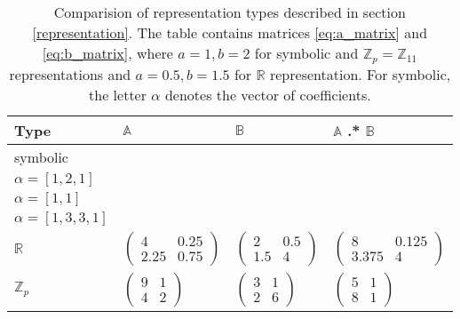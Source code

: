 \begin{table}
\tiny
\centering
\begin{tabular}{llll}
\hline
Type & $\mathbb{A}$ & $\mathbb{B}$ & $\mathbb{A}$ .* $\mathbb{B}$ \\
\hline
symbolic & \specialcell{$\begin{pmatrix} 2 & 1 & 0\\ 0 & 1 & 2 \end{pmatrix}$\\$\alpha = [1, 2, 1]$}  & \specialcell{$\begin{pmatrix} 1 & 0 \\ 0 & 1 \end{pmatrix}$\\$\alpha = [1, 1]$} & \specialcell{$\begin{pmatrix} 3 & 2 & 1 & 0 \\ 0 & 1 & 2 & 3 \end{pmatrix}$\\$\alpha = [1, 3, 3, 1]$} \\[15pt]

$\mathbb{R}$ & $\begin{pmatrix} 4 & 0.25\\ 2.25 & 0.75 \end{pmatrix}$ & $\begin{pmatrix} 2 & 0.5\\ 1.5 & 4 \end{pmatrix}$ & $\begin{pmatrix} 8 & 0.125\\ 3.375 & 4 \end{pmatrix}$ \\[15pt]

$\mathbb{Z}_p$ & $\begin{pmatrix} 9 & 1\\ 4 & 2 \end{pmatrix}$ & $\begin{pmatrix} 3 & 1\\ 2 & 6 \end{pmatrix}$ & $\begin{pmatrix} 5 & 1\\ 8 & 1 \end{pmatrix}$ \\
\hline
\end{tabular}
\caption{Comparision of representation types described in section \ref{representation}. The table contains matrices \ref{eq:a_matrix} and \ref{eq:b_matrix}, where $a=1, b=2$ for symbolic and $\mathbb{Z}_p = \mathbb{Z}_{11}$ representations
and $a=0.5, b=1.5$ for $\mathbb{R}$ representation. For symbolic, the letter $\alpha$ denotes the vector of coefficients.} 
\label{representation_examples}
\end{table}

